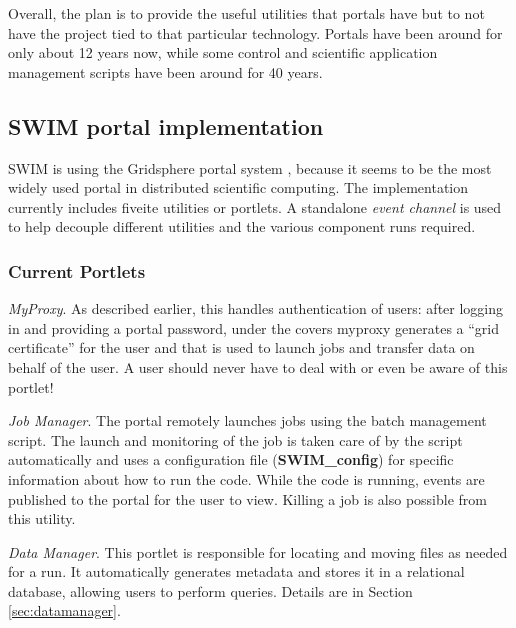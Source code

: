 Overall, the plan is to provide the useful utilities that portals have but to
not have the project tied to that particular technology. Portals have been
around for only about 12 years now, while some control and scientific
application management scripts have been around for 40 years. 

\subsection{SWIM portal implementation}
\label{sec:swimportal} 
SWIM is using the Gridsphere portal system  \cite{gridsphere}, because it seems
to be the most widely used portal in distributed scientific computing.
The implementation currently includes fiveite utilities or portlets. A standalone
{\em event channel} \cite{wsmgpaper} is used to help decouple different utilities
and the various component runs required.
    \subsubsection{Current Portlets} 
    \begin{description}
     \item {\em MyProxy}. As described earlier, this handles authentication of users:
     after logging in and providing a portal password, under the covers myproxy
     generates a ``grid certificate'' for the user and that is used to launch
     jobs and transfer data on behalf of the user. A user should never have to
     deal with or even be aware of this portlet!
     \item {\em Job Manager}.
       The portal remotely launches jobs using the batch management script.
       The launch and monitoring of the job is taken care of by the script
       automatically and uses a configuration file ({\bf SWIM\_config}) for
       specific information about how to run the code.  While the code is
       running, events are published to the portal for the user to view.
       Killing a job is also possible from this utility.
     \item {\em Data Manager}.
        This portlet is responsible for locating and moving
        files as needed for a run. It automatically generates metadata and stores
        it in a relational database, allowing users to perform queries.
        Details are in Section \ref{sec:datamanager}.
    \end{description}

